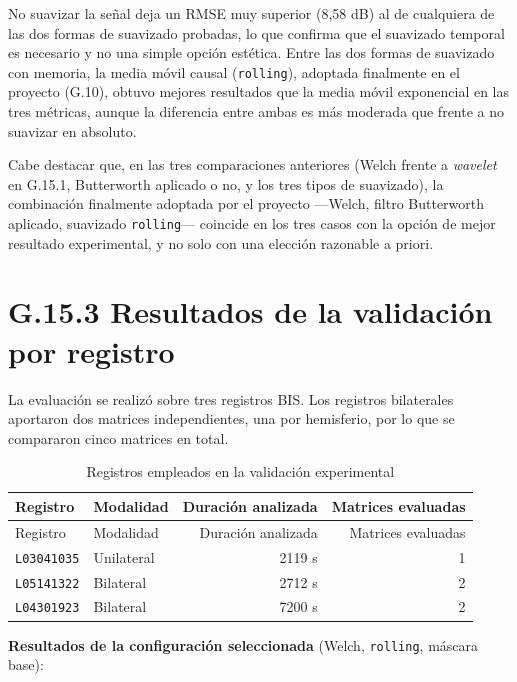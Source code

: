 \documentclass[
  spanish,
  a4paper,
  12pt,
  twoside]{memoir}
\begin{document}
No suavizar la señal deja un RMSE muy superior (8,58 dB) al de
cualquiera de las dos formas de suavizado probadas, lo que confirma que
el suavizado temporal es necesario y no una simple opción estética.
Entre las dos formas de suavizado con memoria, la media móvil causal
(\texttt{rolling}), adoptada finalmente en el proyecto (G.10), obtuvo
mejores resultados que la media móvil exponencial en las tres métricas,
aunque la diferencia entre ambas es más moderada que frente a no
suavizar en absoluto.

Cabe destacar que, en las tres comparaciones anteriores (Welch frente a
\emph{wavelet} en G.15.1, Butterworth aplicado o no, y los tres tipos de
suavizado), la combinación finalmente adoptada por el proyecto ---Welch,
filtro Butterworth aplicado, suavizado \texttt{rolling}--- coincide en
los tres casos con la opción de mejor resultado experimental, y no solo
con una elección razonable a priori.

\section{G.15.3 Resultados de la validación por
registro}\label{g.15.3-resultados-de-la-validaciuxf3n-por-registro}

La evaluación se realizó sobre tres registros BIS. Los registros
bilaterales aportaron dos matrices independientes, una por hemisferio,
por lo que se compararon cinco matrices en total.

\begin{longtable}[]{@{}llrr@{}}
\caption{Registros empleados en la validación
experimental}\label{tbl-registros-validacion}\tabularnewline
\toprule\noalign{}
Registro & Modalidad & Duración analizada & Matrices evaluadas \\
\midrule\noalign{}
\endfirsthead
\toprule\noalign{}
Registro & Modalidad & Duración analizada & Matrices evaluadas \\
\midrule\noalign{}
\endhead
\bottomrule\noalign{}
\endlastfoot
\texttt{L03041035} & Unilateral & 2119 s & 1 \\
\texttt{L05141322} & Bilateral & 2712 s & 2 \\
\texttt{L04301923} & Bilateral & 7200 s & 2 \\
\end{longtable}

\textbf{Resultados de la configuración seleccionada} (Welch,
\texttt{rolling}, máscara base):
\end{document}
